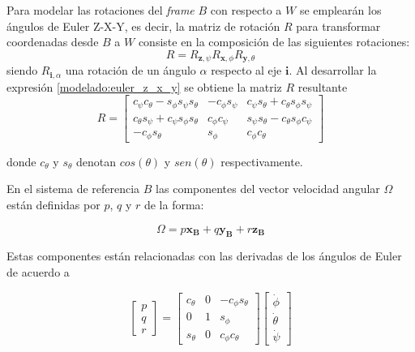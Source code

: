 Para modelar las rotaciones del \textit{frame} $B$ con respecto a $W$ se emplearán los ángulos de Euler Z-X-Y, es decir, la matriz de rotación $R$ para transformar coordenadas desde $B$ a $W$ consiste en la composición de las siguientes rotaciones:
\begin{equation}
	R = R_{\mathbf{z},\psi}R_{\mathbf{x},\phi}R_{\mathbf{y},\theta}
	\label{modelado:euler_z_x_y}
\end{equation}
siendo $R_{\mathbf{i},\alpha}$ una rotación de un ángulo $\alpha$ respecto al eje $\mathbf{i}$. Al desarrollar la expresión \ref{modelado:euler_z_x_y} se obtiene la matriz $R$ resultante
\begin{equation}
	\label{modelado:R}
	R = \begin{bmatrix}
		c_{\psi} c_{\theta} - s_{\phi} s_{\psi} s_{\theta} &  -c_{\phi} s_{\psi}& c_{\psi} s_{\theta} +  c_{\theta} s_{\phi} s_{\psi}\\
		c_{\theta} s_{\psi} +  c_{\psi} s_{\phi} s_{\theta} & c_{\phi} c_{\psi} & s_{\psi} s_{\theta} -  c_{\theta} s_{\phi} c_{\psi} \\
		-c_{\phi}s_{\theta}& s_{\phi} & c_{\phi}c_{\theta} 
	\end{bmatrix}
\end{equation}

donde $c_{\theta}$ y $s_{\theta}$ denotan $cos(\theta)$ y $sen(\theta)$ respectivamente.

En el sistema de referencia $B$ las componentes del vector velocidad angular $\Omega$ están definidas por $p$, $q$ y $r$ de la forma: 

\begin{equation}
	\Omega = p \mathbf{x_B} + q \mathbf{y_B} + r \mathbf{z_B}
	\label{refOmega}
\end{equation}

Estas componentes están relacionadas con las derivadas de los ángulos de Euler de acuerdo a

\begin{equation}
	\begin{bmatrix}
		p\\
		q\\
		r
	\end{bmatrix}  = \begin{bmatrix}
	c_{\theta}&0& -c_{\phi} s_{\theta}\\
	0 & 1 & s_{\phi}\\
	s_{\theta}&0 & c_{\phi} c_{\theta}
\end{bmatrix}\begin{bmatrix}
\dot{\phi}\\
\dot{\theta}\\
\dot{\psi}
\end{bmatrix} 
\end{equation}

